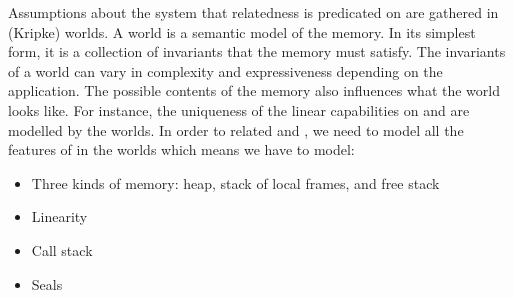 \begin{jversion}
Assumptions about the system that relatedness is predicated on are gathered in (Kripke) worlds.
A world is a semantic model of the memory.
In its simplest form, it is a collection of invariants that the memory must satisfy.
The invariants of a world can vary in complexity and expressiveness depending on the application.
The possible contents of the memory also influences what the world looks like.
For instance, the uniqueness of the linear capabilities on \trgcm{} and \srccm{} are modelled by the worlds.
In order to related \trgcm{} and \srccm{}, we need to model all the features of \srccm{} in the worlds which means we have to model:
\begin{itemize}
\item Three kinds of memory: heap, stack of local frames, and free stack
\item Linearity
\item Call stack
\item Seals
\end{itemize}


\end{jversion}
